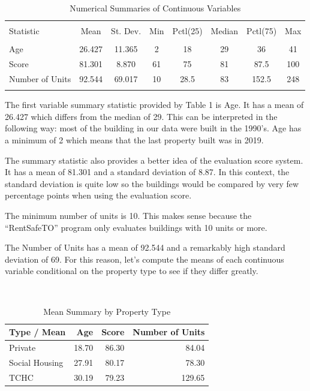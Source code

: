 \documentclass[
]{article}
\begin{document}
\begin{table}[!htbp] \centering 
  \caption{Numerical Summaries of Continuous Variables} 
  \label{} 
\begin{tabular}{@{\extracolsep{5pt}}lccccccc} 
\\[-1.8ex]\hline 
\hline \\[-1.8ex] 
Statistic & \multicolumn{1}{c}{Mean} & \multicolumn{1}{c}{St. Dev.} & \multicolumn{1}{c}{Min} & \multicolumn{1}{c}{Pctl(25)} & \multicolumn{1}{c}{Median} & \multicolumn{1}{c}{Pctl(75)} & \multicolumn{1}{c}{Max} \\ 
\hline \\[-1.8ex] 
Age & 26.427 & 11.365 & 2 & 18 & 29 & 36 & 41 \\ 
Score & 81.301 & 8.870 & 61 & 75 & 81 & 87.5 & 100 \\ 
Number of Units & 92.544 & 69.017 & 10 & 28.5 & 83 & 152.5 & 248 \\ 
\hline \\[-1.8ex] 
\end{tabular} 
\end{table}

The first variable summary statistic provided by Table 1 is Age. It has
a mean of 26.427 which differs from the median of 29. This can be
interpreted in the following way: most of the building in our data were
built in the 1990's. Age has a minimum of 2 which means that the last
property built was in 2019.

The summary statistic also provides a better idea of the evaluation
score system. It has a mean of 81.301 and a standard deviation of 8.87.
In this context, the standard deviation is quite low so the buildings
would be compared by very few percentage points when using the
evaluation score.

The minimum number of units is 10. This makes sense because the
``RentSafeTO'' program only evaluates buildings with 10 units or more.

The Number of Units has a mean of 92.544 and a remarkably high standard
deviation of 69. For this reason, let's compute the means of each
continuous variable conditional on the property type to see if they
differ greatly.

~

\begin{table}[ht]
\centering
\caption{Mean Summary by Property Type} 
\begin{tabular}{lrrr}
  \hline
Type / Mean & Age & Score & Number of Units \\ 
  \hline
Private & 18.70 & 86.30 & 84.04 \\ 
  Social Housing & 27.91 & 80.17 & 78.30 \\ 
  TCHC & 30.19 & 79.23 & 129.65 \\ 
   \hline
\end{tabular}
\end{table}
\end{document}
